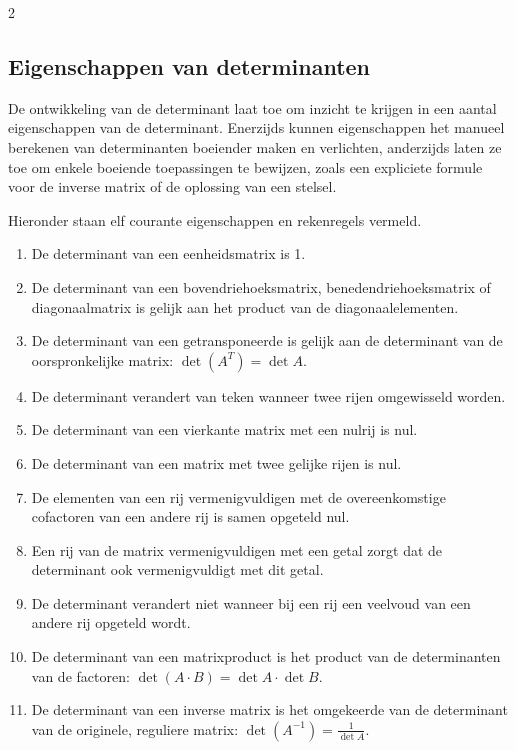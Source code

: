 \begin{multicols}{2}


 \subsection{Eigenschappen van determinanten}
 \label{par:eig} 
 De ontwikkeling van de determinant laat toe om inzicht te krijgen in een aantal eigenschappen van de determinant. Enerzijds kunnen eigenschappen het manueel berekenen van determinanten boeiender maken en verlichten, anderzijds laten ze toe om enkele boeiende toepassingen te bewijzen, zoals een expliciete formule voor de inverse matrix of de oplossing van een stelsel.

Hieronder staan elf courante eigenschappen en rekenregels vermeld.

\begin{enumerate}
    \item De determinant van een eenheidsmatrix is 1.
    \item De determinant van een bovendriehoeksmatrix, benedendriehoeksmatrix of diagonaalmatrix is gelijk aan het product van de diagonaalelementen.
    \item De determinant van een getransponeerde is gelijk aan de determinant van de oorspronkelijke matrix: $\det (A^T) = \det A$.
    \item De determinant verandert van teken wanneer twee rijen omgewisseld worden.
    \item De determinant van een vierkante matrix met een nulrij is nul.
    \item De determinant van een matrix met twee gelijke rijen is nul.
    \item De elementen van een rij vermenigvuldigen met de overeenkomstige cofactoren van een andere rij is samen opgeteld nul.
    \item Een rij van de matrix vermenigvuldigen met een getal zorgt dat de determinant ook vermenigvuldigt met dit getal.
    \item De determinant verandert niet wanneer bij een rij een veelvoud van een andere rij opgeteld wordt. 
    \item De determinant van een matrixproduct is het product van de determinanten van de factoren: $\det(A\cdot B)=\det A \cdot \det B$.
    \item De determinant van een inverse matrix is het omgekeerde van de determinant van de originele, reguliere matrix: $\det(A^{-1})= \displaystyle\frac{1}{\det A}$. 
\end{enumerate}


\end{multicols}
